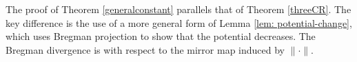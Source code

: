 




The proof of Theorem \ref{generalconstant} parallels that of Theorem \ref{threeCR}. The key difference is the use of a more general form of Lemma \ref{lem: potential-change}, which uses Bregman projection to show that the potential decreases. The Bregman divergence is with respect to the mirror map induced by $\| \cdot \|$. %












